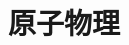 \documentclass[../../all/physics-standard_questions_all.tex]{subfiles}
\begin{document}
\section{原子物理}
\end{document}
